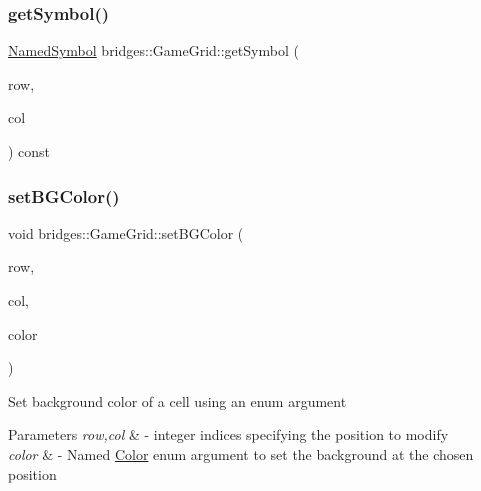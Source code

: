 \mbox{\label{classbridges_1_1_game_grid_a9e3450aae2d92f781b298a5cd0aa5b62}} 
\subsubsection{\texorpdfstring{get\+Symbol()}{getSymbol()}}
{\footnotesize\ttfamily \hyperlink{namespacebridges_acfb0a4f7877d8f63de3e6862004c50ed}{Named\+Symbol} bridges\+::\+Game\+Grid\+::get\+Symbol (\begin{DoxyParamCaption}\item[{int}]{row,  }\item[{int}]{col }\end{DoxyParamCaption}) const\hspace{0.3cm}{\ttfamily [inline]}}

\mbox{\label{classbridges_1_1_game_grid_aa877047d613ace46190c161f0c31a1b3}} 
\subsubsection{\texorpdfstring{set\+B\+G\+Color()}{setBGColor()}}
{\footnotesize\ttfamily void bridges\+::\+Game\+Grid\+::set\+B\+G\+Color (\begin{DoxyParamCaption}\item[{int}]{row,  }\item[{int}]{col,  }\item[{\hyperlink{namespacebridges_ad811207d8898a7fd6b72a74725e68357}{Named\+Color}}]{color }\end{DoxyParamCaption})\hspace{0.3cm}{\ttfamily [inline]}}

Set background color of a cell using an enum argument


\begin{DoxyParams}{Parameters}
{\em row,col} & -\/ integer indices specifying the position to modify \\
\hline
{\em color} & -\/ Named \hyperlink{classbridges_1_1_color}{Color} enum argument to set the background at the chosen position \\
\hline
\end{DoxyParams}
\mbox{\label{classbridges_1_1_game_grid_aff88dfdc61c69af5881665d937f07ee4}} 
